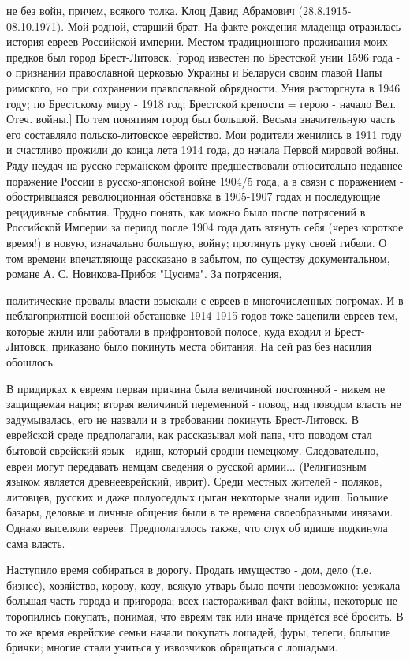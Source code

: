 не без войн, причем, всякого толка.
Клоц Давид Абрамович (28.8.1915-08.10.1971). Мой родной, старший брат. На факте рождения младенца отразилась история евреев Российской империи. Местом традиционного проживания моих предков был город Брест-Литовск. [город известен по Брестской унии 1596 года - о признании православной церковью Украины и Беларуси своим главой Папы римского, но при сохранении православной обрядности. Уния расторгнута в 1946 году; по Брестскому миру - 1918 год; Брестской крепости = герою - начало Вел. Отеч. войны.]
По тем понятиям город был большой. Весьма значительную часть его составляло польско-литовское еврейство. Мои родители женились в 1911 году и счастливо прожили до конца лета 1914 года, до начала Первой мировой войны.
Ряду неудач на русско-германском фронте предшествовали относительно недавнее поражение России в русско-японской войне 1904/5 года, а в связи с поражением - обострившаяся революционная обстановка в 1905-1907 годах и последующие рецидивные события.
Трудно понять, как можно было после потрясений в Российской Империи за период после 1904 года дать втянуть себя (через короткое время!) в новую, изначально большую, войну; протянуть руку своей гибели. О том времени впечатляюще рассказано в забытом, по существу документальном, романе А. С. Новикова-Прибоя "Цусима". За потрясения,

политические провалы власти взыскали с евреев в многочисленных погромах. И в неблагоприятной военной обстановке 1914-1915 годов тоже зацепили евреев тем, которые жили или работали в прифронтовой полосе, куда входил и Брест-Литовск, приказано было покинуть места обитания. На сей раз без насилия обошлось.

В придирках к евреям первая причина была величиной постоянной - никем не защищаемая нация; вторая величиной переменной - повод, над поводом власть не задумывалась, его не назвали и в требовании покинуть Брест-Литовск. В еврейской среде предполагали, как рассказывал мой папа, что поводом стал бытовой еврейский язык - идиш, который сродни немецкому. Следовательно, евреи могут передавать немцам сведения о русской армии... (Религиозным языком является древнееврейский, иврит). Среди местных жителей - поляков, литовцев, русских и даже полуоседлых цыган некоторые знали идиш. Большие базары, деловые и личные общения были в те времена своеобразными инязами. Однако выселяли евреев. Предполагалось также, что слух об идише подкинула сама власть.

Наступило время собираться в дорогу. Продать имущество - дом, дело (т.е. бизнес), хозяйство, корову, козу, всякую утварь было почти невозможно: уезжала большая часть города и пригорода; всех настораживал факт войны, некоторые не торопились покупать, понимая, что евреям так или иначе придётся всё бросить. В то же время еврейские семьи начали покупать лошадей, фуры, телеги, большие брички; многие стали учиться у извозчиков обращаться с лошадьми.

